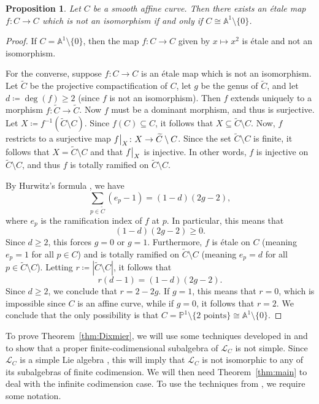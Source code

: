 \documentclass[12pt]{amsart}
\theoremstyle{plain}
\newtheorem{proposition}[theorem]{Proposition}
\theoremstyle{definition}
\numberwithin{equation}{section}
\def\L{\mathcal{L}}
\def\Aa{\mathbb{A}}
\def\PP{\mathbb{P}}
\def\nonzero{\setminus \{0\}}
\newcommand\restr[2]{{\left.\kern-\nulldelimiterspace #1 \vphantom{\big|} \right|_{#2}}}
\begin{document}
\begin{proposition}\label{prop:Jacobian curves}
    Let $C$ be a smooth affine curve. Then there exists an \'etale map $f \colon C \to C$ which is not an isomorphism if and only if $C \cong \Aa^1 \nonzero$.
\end{proposition}
\begin{proof}
    If $C = \Aa^1 \nonzero$, then the map $f \colon C \to C$ given by $x \mapsto x^2$ is \'etale and not an isomorphism.

    For the converse, suppose $f \colon C \to C$ is an \'etale map which is not an isomorphism. Let $\widetilde{C}$ be the projective compactification of $C$, let $g$ be the genus of $\widetilde{C}$, and let $d \coloneqq \deg(f) \geq 2$ (since $f$ is not an isomorphism). Then $f$ extends uniquely to a morphism $f \colon \widetilde{C} \to \widetilde{C}$. Now $f$ must be a dominant morphism, and thus is surjective. Let $X \coloneqq f^{-1}(\widetilde{C} \setminus C)$. Since $f(C) \subseteq C$, it follows that $X \subseteq \widetilde{C} \setminus C$. Now, $f$ restricts to a surjective map $\restr{f}{X} \colon X \to \widetilde{C} \setminus C$. Since the set $\widetilde{C} \setminus C$ is finite, it follows that $X = \widetilde{C} \setminus C$ and that $\restr{f}{X}$ is injective. In other words, $f$ is injective on $\widetilde{C} \setminus C$, and thus $f$ is totally ramified on $\widetilde{C} \setminus C$.
    
    By Hurwitz's formula \cite[Theorem II.5.9]{Silverman}, we have
    $$\sum_{p \in \widetilde{C}} (e_p - 1) = (1 - d)(2g - 2),$$
    where $e_p$ is the ramification index of $f$ at $p$. In particular, this means that
    $$(1 - d)(2g - 2) \geq 0.$$
    Since $d \geq 2$, this forces $g = 0$ or $g = 1$. Furthermore, $f$ is \'etale on $C$ (meaning $e_p = 1$ for all $p \in C$) and is totally ramified on $\widetilde{C} \setminus C$ (meaning $e_p = d$ for all $p \in \widetilde{C} \setminus C$). Letting $r \coloneqq |\widetilde{C} \setminus C|$, it follows that
    $$r(d - 1) = (1 - d)(2g - 2).$$
    Since $d \geq 2$, we conclude that $r = 2 - 2g$. If $g = 1$, this means that $r = 0$, which is impossible since $C$ is an affine curve, while if $g = 0$, it follows that $r = 2$. We conclude that the only possibility is that $C = \PP^1 \setminus \{2 \text{ points}\} \cong \Aa^1 \nonzero$.
\end{proof}

To prove Theorem~\ref{thm:Dixmier}, we will use some techniques developed in \cite{Grabowski} and \cite{Siebert} to show that a proper finite-codimensional subalgebra of $\L_C$ is not simple. Since $\L_C$ is a simple Lie algebra \cite{Siebert}, this will imply that $\L_C$ is not isomorphic to any of its subalgebras of finite codimension. We will then need Theorem~\ref{thm:main} to deal with the infinite codimension case. To use the techniques from \cite{Grabowski}, we require some notation.
\end{document}
